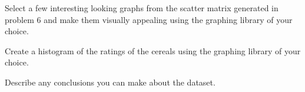 \documentclass{homework}
\begin{document}
\begin{problem}[8]
    Select a few interesting looking graphs from the scatter matrix generated in problem 6 and make them visually appealing using the graphing library of your choice.
\end{problem}

\begin{problem}[9]
    Create a histogram of the ratings of the cereals using the graphing library of your choice.
\end{problem}

\begin{problem}[10]
    Describe any conclusions you can make about the dataset.
\end{problem}
\end{document}
